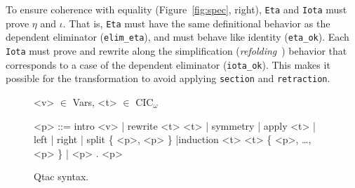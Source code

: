 
To ensure coherence with equality (Figure~\ref{fig:spec}, right),
\lstinline{Eta} and \lstinline{Iota} must prove $\eta$ and $\iota$.
That is, \lstinline{Eta} must have the same definitional behavior as the dependent eliminator (\lstinline{elim_eta}),
and must behave like identity (\lstinline{eta_ok}).
Each \lstinline{Iota} must prove and rewrite along the simplification (\textit{refolding}~\cite{boutillier:tel-01054723}) behavior that corresponds to a case of the dependent eliminator (\lstinline{iota_ok}).
This makes it possible for the transformation to
avoid applying \lstinline{section} and \lstinline{retraction}.

\begin{figure*}
\small
\begin{grammar}
<v> $\in$ Vars, <t> $\in$ CIC$_{\omega}$

<p> ::= intro <v> |  rewrite <t> <t> | symmetry | apply <t> | left | right | split \{ <p>, <p> \} |induction <t> <t> \{ <p>, \ldots, <p> \} | <p> . <p>
\end{grammar}
\vspace{-0.3cm}
\caption{Qtac syntax.}
\vspace{-0.19cm}
\label{fig:ltacsyntax1}
\end{figure*}

